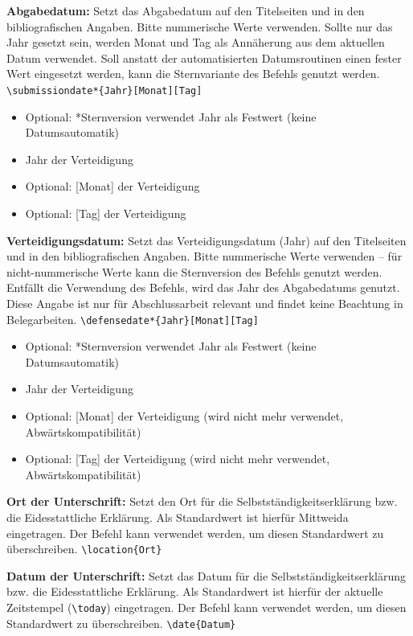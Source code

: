 	\textbf{Abgabedatum:}\label{cmd:submissiondate}
	Setzt das Abgabedatum auf den Titelseiten und in den bibliografischen Angaben.
	Bitte nummerische Werte verwenden.
	Sollte nur das Jahr gesetzt sein, werden Monat und Tag als Annäherung aus dem aktuellen Datum verwendet.
	Soll anstatt der automatisierten Datumsroutinen einen fester Wert eingesetzt werden, kann die Sternvariante des Befehls genutzt werden.
	\newline
	\verb|\submissiondate*{Jahr}[Monat][Tag]|
	\begin{itemize}
		\item Optional: *Sternversion verwendet Jahr als Festwert (keine Datumsautomatik)
		\item Jahr der Verteidigung
		\item Optional: [Monat] der Verteidigung
		\item Optional: [Tag] der Verteidigung
	\end{itemize}
	
	\textbf{Verteidigungsdatum:}\label{cmd:defensedate}
	Setzt das Verteidigungsdatum (Jahr) auf den Titelseiten und in den bibliografischen Angaben.
	Bitte nummerische Werte verwenden -- für nicht-nummerische Werte kann die Sternversion des Befehls genutzt werden.
	Entfällt die Verwendung des Befehls, wird das Jahr des Abgabedatums genutzt.
	Diese Angabe ist nur für Abschlussarbeit relevant und findet keine Beachtung in Belegarbeiten.
	\newline
	\verb|\defensedate*{Jahr}[Monat][Tag]|
	\begin{itemize}
		\item Optional: *Sternversion verwendet Jahr als Festwert (keine Datumsautomatik)
		\item Jahr der Verteidigung
		\item Optional: [Monat] der Verteidigung (wird nicht mehr verwendet, Abwärtskompatibilität)
		\item Optional: [Tag] der Verteidigung (wird nicht mehr verwendet, Abwärtskompatibilität)
	\end{itemize}
	
	\textbf{Ort der Unterschrift:}\label{cmd:location}
	Setzt den Ort für die Selbstständigkeitserklärung bzw. die Eidesstattliche Erklärung.
	Als Standardwert ist hierfür Mittweida eingetragen.
	Der Befehl kann verwendet werden, um diesen Standardwert zu überschreiben.
	\newline
	\verb|\location{Ort}|
	
	\textbf{Datum der Unterschrift:}\label{cmd:date}
	Setzt das Datum für die Selbstständigkeitserklärung bzw. die Eidesstattliche Erklärung.
	Als Standardwert ist hierfür der aktuelle Zeitstempel (\verb|\today|) eingetragen.
	Der Befehl kann verwendet werden, um diesen Standardwert zu überschreiben.
	\newline
	\verb|\date{Datum}|
	
